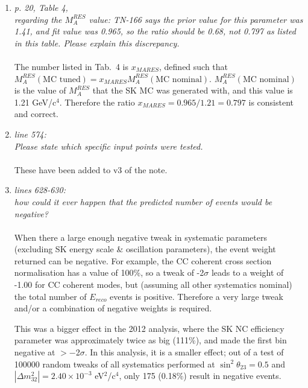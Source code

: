 \begin{enumerate}
  
  \vspace{5 mm}
\item
  {\em
    p. 20, Table 4,\\
    regarding the $M_A^{RES}$ value: TN-166 says the prior value for this parameter was 1.41, and fit value was 0.965, so the ratio should be 0.68, not 0.797 as listed in this table.  Please explain this discrepancy.
  }\\
  \\
  The number listed in Tab.\ 4 is $x_{MARES}$, defined such that $M_A^{RES}(\textrm{MC tuned}) = x_{MARES} M_A^{RES}(\textrm{MC nominal})$.
  $M_A^{RES}(\textrm{MC nominal})$ is the value of $M_A^{RES}$ that the SK MC was generated with, and this value is 1.21 GeV/c$^4$.
  Therefore the ratio $x_{MARES} = 0.965/1.21 = 0.797$ is consistent and correct.
  
  \vspace{5 mm}
\item
  {\em
    line 574:\\
    Please state which specific input points were tested.
  }\\
  \\
  These have been added to v3 of the note.

  \vspace{5 mm}
\item
  {\em
    lines 628-630:\\
    how could it ever happen that the predicted number of events would be negative?
  }\\
  \\
  When there a large enough negative tweak in systematic parameters (excluding SK energy scale \& oscillation parameters), the event weight returned can be negative.
  For example, the CC coherent cross section normalisation has a value of 100\%, so a tweak of -2$\sigma$ leads to a weight of -1.00 for CC coherent modes,
  but (assuming all other systematics nominal) the total number of $E_{reco}$ events is positive.
  Therefore a very large tweak and/or a combination of negative weights is required.
  
  This was a bigger effect in the 2012 analysis, where the SK NC efficiency parameter was approximately twice as big (111\%), and made the first bin negative at $>-$2$\sigma$.
  In this analysis, it is a smaller effect; out of a test of 100000 random tweaks of all systematics performed at
  $\sin^2\theta_{23} = 0.5$ and $|\Delta m^2_{32}| = 2.40 \times 10^{-3}$ eV$^2$/c$^4$, only 175 (0.18\%) result in negative events.


\end{enumerate}
